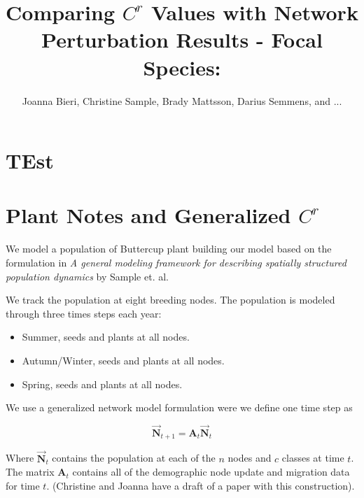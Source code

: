 \documentclass[10pt]{article}
\title{Comparing $C^r$ Values with Network Perturbation Results - Focal Species: } %
\date{}
\author{Joanna Bieri, Christine Sample, Brady Mattsson, Darius Semmens, and ...}
\begin{document}


\newcommand{\multilineR}[1]{\begin{tabular}[b]{@{}r@{}}#1\end{tabular}}
\newcommand{\multilineL}[1]{\begin{tabular}[b]{@{}l@{}}#1\end{tabular}}
\newcommand{\multilineC}[1]{\begin{tabular}[b]{@{}c@{}}#1\end{tabular}}

\thispagestyle{empty}

\maketitle

\tableofcontents

\section{TEst}



\section{Plant Notes and Generalized \texorpdfstring{$C^r$}{CR} }
We model a population of Buttercup plant building our model based on the formulation in  {\it{A general modeling framework for describing spatially structured population dynamics}} by Sample et. al.

We track the population at eight breeding nodes. The population is modeled through three times steps each year:
\begin{itemize}
\item Summer, seeds and plants at all nodes.
\item Autumn/Winter, seeds and plants at all nodes.
\item Spring, seeds and plants at all nodes. 
\end{itemize}

We use a generalized network model formulation were we define one time step as

\begin{equation}
\vec{\mathbf{N}}_{t+1}={\mathbf{A}_t}\vec{\mathbf{N}}_t
\end{equation}

Where $\vec{\mathbf{N}}_{t}$ contains the population at each of the $n$ nodes and $c$ classes at time $t$. The matrix $\mathbf{A}_t$ contains all of the demographic node update and migration data for time $t$. (Christine and Joanna have a draft of a paper with this construction).
\end{document}
